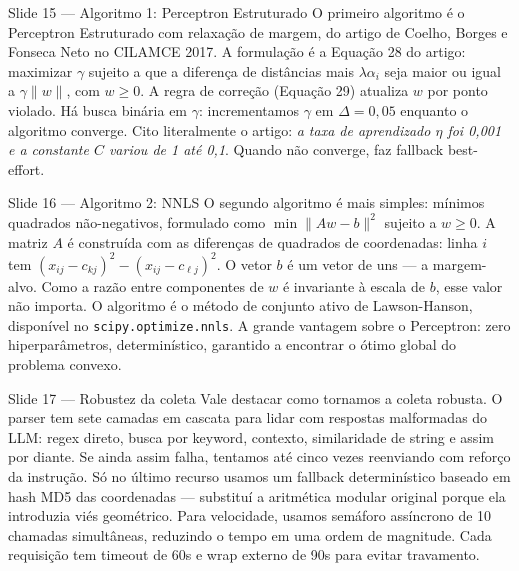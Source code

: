 \documentclass[aspectratio=169,10pt]{beamer}
\begin{document}
\begin{frame}{Slide 15 --- Algoritmo 1: Perceptron Estruturado}
\footnotesize
O primeiro algoritmo \'e o Perceptron Estruturado com relaxa\c{c}\~ao de margem, do artigo de Coelho, Borges e Fonseca Neto no CILAMCE 2017. A formula\c{c}\~ao \'e a Equa\c{c}\~ao 28 do artigo: maximizar $\gamma$ sujeito a que a diferen\c{c}a de dist\^ancias mais $\lambda \alpha_i$ seja maior ou igual a $\gamma \|w\|$, com $w \geq 0$. A regra de corre\c{c}\~ao (Equa\c{c}\~ao 29) atualiza $w$ por ponto violado. H\'a busca bin\'aria em $\gamma$: incrementamos $\gamma$ em $\Delta = 0{,}05$ enquanto o algoritmo converge. Cito literalmente o artigo: \emph{a taxa de aprendizado $\eta$ foi 0{,}001 e a constante $C$ variou de 1 at\'e 0{,}1}. Quando n\~ao converge, faz fallback best-effort.
\end{frame}

\begin{frame}{Slide 16 --- Algoritmo 2: NNLS}
\footnotesize
O segundo algoritmo \'e mais simples: m\'inimos quadrados n\~ao-negativos, formulado como $\min \|Aw - b\|^2$ sujeito a $w \geq 0$. A matriz $A$ \'e constru\'ida com as diferen\c{c}as de quadrados de coordenadas: linha $i$ tem $(x_{ij} - c_{kj})^2 - (x_{ij} - c_{\ell j})^2$. O vetor $b$ \'e um vetor de uns --- a margem-alvo. Como a raz\~ao entre componentes de $w$ \'e invariante \`a escala de $b$, esse valor n\~ao importa. O algoritmo \'e o m\'etodo de conjunto ativo de Lawson-Hanson, dispon\'ivel no \texttt{scipy.optimize.nnls}. A grande vantagem sobre o Perceptron: zero hiperpar\^ametros, determin\'istico, garantido a encontrar o \'otimo global do problema convexo.
\end{frame}

\begin{frame}{Slide 17 --- Robustez da coleta}
\footnotesize
Vale destacar como tornamos a coleta robusta. O parser tem sete camadas em cascata para lidar com respostas malformadas do LLM: regex direto, busca por keyword, contexto, similaridade de string e assim por diante. Se ainda assim falha, tentamos at\'e cinco vezes reenviando com refor\c{c}o da instru\c{c}\~ao. S\'o no \'ultimo recurso usamos um fallback determin\'istico baseado em hash MD5 das coordenadas --- substitu\'i a aritm\'etica modular original porque ela introduzia vi\'es geom\'etrico. Para velocidade, usamos sem\'aforo ass\'incrono de 10 chamadas simult\^aneas, reduzindo o tempo em uma ordem de magnitude. Cada requisi\c{c}\~ao tem timeout de 60s e wrap externo de 90s para evitar travamento.
\end{frame}
\end{document}
